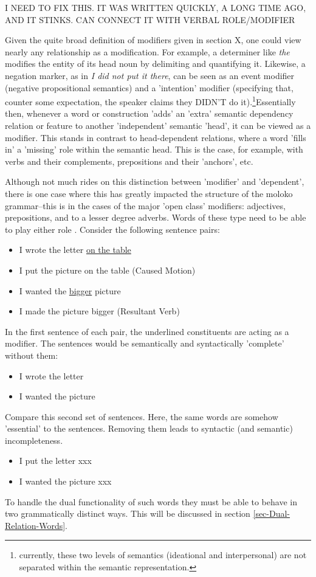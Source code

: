 I NEED TO FIX THIS. IT WAS WRITTEN QUICKLY, A LONG TIME AGO, AND IT STINKS.
CAN CONNECT IT WITH VERBAL ROLE/MODIFIER

Given the quite broad definition of modifiers given in section X, one could view nearly any relationship as a modification. For example, a determiner like \emph{the} modifies the entity of its head noun by delimiting and quantifying it. Likewise, a negation marker, as in \emph{I did not put it there}, can be seen as an event modifier (negative propositional semantics) and a 'intention' modifier (specifying that, counter some expectation, the speaker claims they DIDN'T do it).\footnote{currently, these two levels of semantics (ideational and interpersonal) are not separated within the semantic representation.}Essentially then, whenever a word or construction 'adds' an 'extra' semantic dependency relation or feature to another 'independent' semantic 'head', it can be viewed as a modifier. This stands in contrast to head-dependent relations, where a word 'fills in' a 'missing'  role within the semantic head. This is the case, for example, with verbs and their complements, prepositions and their 'anchors', etc. 

Although not much rides on this distinction between 'modifier' and 'dependent', there is one case where this has greatly impacted the structure of the moloko grammar--this is in the cases of the major 'open class' modifiers: adjectives,  prepositions, and to a lesser degree adverbs. Words of these type need to be able to play either role . Consider the following sentence pairs:

\begin{itemize}
\item I wrote the letter \underline{on the table}
\item I put the picture on the table        (Caused Motion)
\item I wanted the \underline{bigger} picture
\item I made the picture bigger             (Resultant Verb)
\end{itemize}
In the first sentence of each pair, the underlined constituents are acting as a modifier. The sentences would be semantically and syntactically 'complete' without them:
\begin{itemize}
\item	I wrote the letter
\item	I wanted the picture
\end{itemize}
Compare this second set of sentences. Here, the same words are somehow 'essential' to the sentences. Removing them leads to syntactic (and semantic) incompleteness.
\begin{itemize}
\item	I put the letter xxx
\item	I wanted the picture xxx
\end{itemize}
To handle the dual functionality of such words they must be able to behave in two grammatically distinct ways. This will be discussed in section \ref{sec-Dual-Relation-Words}. 


